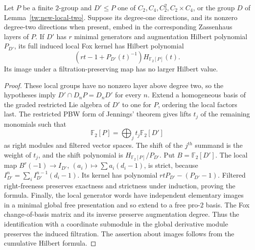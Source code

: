 \begin{lemma}\label{tw:filtered-local-freeness}
Let $P$ be a finite $2$-group and $D'\le P$ one of
$C_2,C_4,C_2^2,C_2\times C_4$, or the group $D$ of
Lemma~\ref{tw:new-local-two}. Suppose its degree-one directions, and
its nonzero degree-two directions when present, embed in the corresponding
Zassenhaus layers of $P$. If $D'$ has $r$ minimal generators and
augmentation Hilbert polynomial $P_{D'}$, its full induced local Fox
kernel has Hilbert polynomial
\begin{equation}\label{tw:local-full-cost}
 \left(rt-1+P_{D'}(t)^{-1}\right)H_{\mathbb F_2[P]}(t).
\end{equation}
Its image under a filtration-preserving map has no larger Hilbert value.
\end{lemma}
\begin{proof}
These local groups have no nonzero layer above degree two, so the
hypotheses imply $D'\cap D_nP=D_nD'$ for every $n$.
Extend a homogeneous basis of the graded restricted Lie algebra of $D'$
to one for $P$, ordering the local factors last. The restricted PBW
form of Jennings' theorem \cite{Jennings,Quillen} gives lifts $t_j$ of the
remaining monomials such that
\[
 \mathbb F_2[P]=\bigoplus_jt_j\mathbb F_2[D']
\]
as right modules and filtered vector spaces. The shift of the $j^{th}$
summand is the weight of $t_j$, and the shift polynomial is
$H_{\mathbb F_2[P]}/P_{D'}$.
Put $B=\mathbb F_2[D']$. The local map
$B^r(-1)\to I_{D'}$, $(a_i)\mapsto\sum a_i(d_i-1)$, is strict, because
$I_{D'}^n=\sum_iI_{D'}^{n-1}(d_i-1)$. Its kernel has polynomial
$rtP_{D'}-(P_{D'}-1)$. Filtered right-freeness preserves exactness and
strictness under induction, proving the formula. Finally, the local
generator words have independent elementary images in a minimal global
free presentation and so extend to a free pro-$2$ basis. The Fox
change-of-basis matrix and its inverse preserve augmentation degree.
Thus the identification with a coordinate submodule in the global
derivative module preserves the induced filtration. The assertion about
images follows from the cumulative Hilbert formula.
\end{proof}

